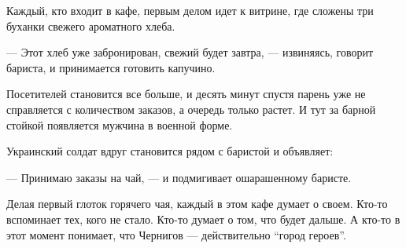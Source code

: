 Каждый, кто входит в кафе, первым делом идет к витрине, где сложены три буханки
свежего ароматного хлеба. 

— Этот хлеб уже забронирован, свежий будет завтра, — извиняясь, говорит
бариста, и принимается готовить капучино. 

Посетителей становится все больше, и десять минут спустя парень уже не
справляется с количеством заказов, а очередь только растет. И тут за барной
стойкой появляется мужчина в военной форме. 

Украинский солдат вдруг становится рядом с баристой и объявляет: 

— Принимаю заказы на чай, — и подмигивает ошарашенному баристе. 

Делая первый глоток горячего чая, каждый в этом кафе думает о своем. Кто-то
вспоминает тех, кого не стало. Кто-то думает о том, что будет дальше. А кто-то
в этот момент понимает, что Чернигов — действительно \enquote{город героев}.
